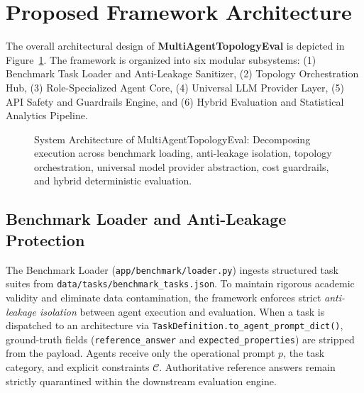 \section{Proposed Framework Architecture}
\label{sec:framework}

The overall architectural design of \textbf{MultiAgentTopologyEval} is depicted in Figure~\ref{fig:system_architecture}. The framework is organized into six modular subsystems: (1) Benchmark Task Loader and Anti-Leakage Sanitizer, (2) Topology Orchestration Hub, (3) Role-Specialized Agent Core, (4) Universal LLM Provider Layer, (5) API Safety and Guardrails Engine, and (6) Hybrid Evaluation and Statistical Analytics Pipeline.

\begin{figure}[t]
\centering

\caption{System Architecture of MultiAgentTopologyEval: Decomposing execution across benchmark loading, anti-leakage isolation, topology orchestration, universal model provider abstraction, cost guardrails, and hybrid deterministic evaluation.}
\label{fig:system_architecture}
\end{figure}

\subsection{Benchmark Loader and Anti-Leakage Protection}
The Benchmark Loader (\texttt{app/benchmark/loader.py}) ingests structured task suites from \texttt{data/tasks/benchmark\_tasks.json}. To maintain rigorous academic validity and eliminate data contamination, the framework enforces strict \textit{anti-leakage isolation} between agent execution and evaluation. When a task is dispatched to an architecture via \texttt{TaskDefinition.to\_agent\_prompt\_dict()}, ground-truth fields (\texttt{reference\_answer} and \texttt{expected\_properties}) are stripped from the payload. Agents receive only the operational prompt $p$, the task category, and explicit constraints $\mathcal{C}$. Authoritative reference answers remain strictly quarantined within the downstream evaluation engine.

